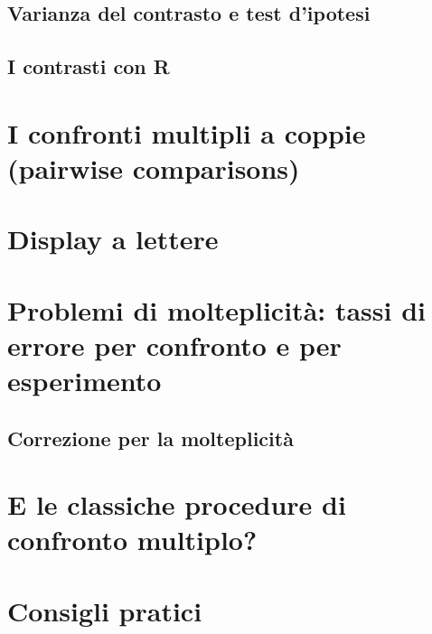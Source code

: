 \documentclass[a4paper,12pt,oneside]{book}
\begin{document}
\hypertarget{varianza-del-contrasto-e-test-dipotesi}{%
\subsection{Varianza del contrasto e test d'ipotesi}\label{varianza-del-contrasto-e-test-dipotesi}}

\hypertarget{i-contrasti-con-r}{%
\subsection{I contrasti con R}\label{i-contrasti-con-r}}

\hypertarget{i-confronti-multipli-a-coppie-pairwise-comparisons}{%
\section{I confronti multipli a coppie (pairwise comparisons)}\label{i-confronti-multipli-a-coppie-pairwise-comparisons}}

\hypertarget{display-a-lettere}{%
\section{Display a lettere}\label{display-a-lettere}}

\hypertarget{problemi-di-molteplicita-tassi-di-errore-per-confronto-e-per-esperimento}{%
\section{Problemi di molteplicità: tassi di errore per confronto e per esperimento}\label{problemi-di-molteplicita-tassi-di-errore-per-confronto-e-per-esperimento}}

\hypertarget{correzione-per-la-molteplicita}{%
\subsection{Correzione per la molteplicità}\label{correzione-per-la-molteplicita}}

\hypertarget{e-le-classiche-procedure-di-confronto-multiplo}{%
\section{E le classiche procedure di confronto multiplo?}\label{e-le-classiche-procedure-di-confronto-multiplo}}

\hypertarget{consigli-pratici}{%
\section{Consigli pratici}\label{consigli-pratici}}
\end{document}
